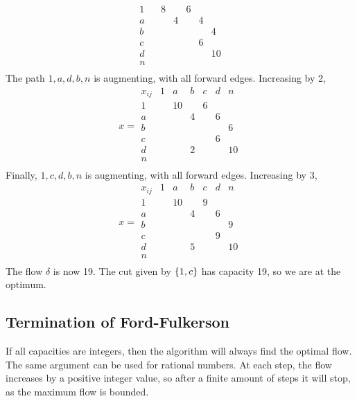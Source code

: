 \begin{example}
\[\begin{array}{c|cccccc}
			1      &   & 8 &   & 6 &   &    \\
			a      &   &   & 4 &   & 4 &    \\
			b      &   &   &   &   &   & 4  \\
			c      &   &   &   &   & 6 &    \\
			d      &   &   &   &   &   & 10 \\
			n                               \\
		\end{array}
	\]
	The path \( 1,a,d,b,n \) is augmenting, with all forward edges.
	Increasing by 2,
	\[
		x = \begin{array}{c|cccccc}
			x_{ij} & 1 & a  & b & c & d & n  \\\hline
			1      &   & 10 &   & 6 &   &    \\
			a      &   &    & 4 &   & 6 &    \\
			b      &   &    &   &   &   & 6  \\
			c      &   &    &   &   & 6 &    \\
			d      &   &    & 2 &   &   & 10 \\
			n                                \\
		\end{array}
	\]
	Finally, \( 1,c,d,b,n \) is augmenting, with all forward edges.
	Increasing by 3,
	\[
		x = \begin{array}{c|cccccc}
			x_{ij} & 1 & a  & b & c & d & n  \\\hline
			1      &   & 10 &   & 9 &   &    \\
			a      &   &    & 4 &   & 6 &    \\
			b      &   &    &   &   &   & 9  \\
			c      &   &    &   &   & 9 &    \\
			d      &   &    & 5 &   &   & 10 \\
			n                                \\
		\end{array}
	\]
	The flow \( \delta \) is now 19.
	The cut given by \( \qty{1,c} \) has capacity 19, so we are at the optimum.
\end{example}

\subsection{Termination of Ford-Fulkerson}
If all capacities are integers, then the algorithm will always find the optimal flow.
The same argument can be used for rational numbers.
At each step, the flow increases by a positive integer value, so after a finite amount of steps it will stop, as the maximum flow is bounded.

